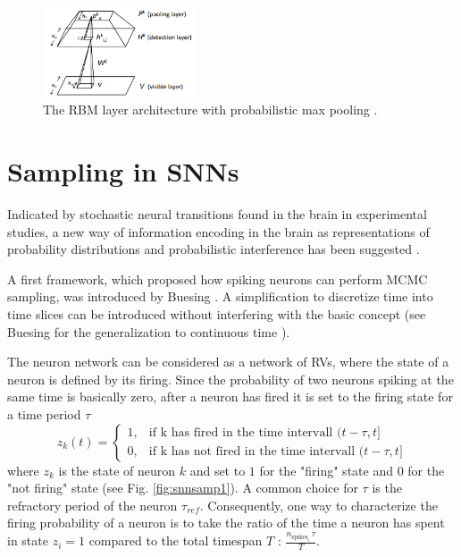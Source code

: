 \begin{figure}[h!]
	\centering
    	\includegraphics[width=0.4\textwidth]{imgs/prob_max_pool.png} 
    \caption{The RBM layer architecture with probabilistic max pooling \cite{lee2009convolutional}.}
	\label{fig:probmaxpool}
\end{figure}


\section{Sampling in SNNs} \label{c:snnsampling}

Indicated by stochastic neural transitions found in the brain in experimental studies, a new way of information encoding in the brain as representations of probability distributions and probabilistic interference has been suggested \cite{griffiths2008bayesian}\cite{lee2003hierarchical}\cite{yang2007probabilistic}.


A first framework, which proposed how spiking neurons can perform MCMC sampling, was introduced by Buesing \cite{Buesing2011}.
A simplification to discretize time into time slices can be introduced without interfering with the basic concept (see Buesing for the generalization to continuous time \cite{Buesing2011}).

The neuron network can be considered as a network of RVs, where the state of a neuron is defined by its firing. 
Since the probability of two neurons spiking at the same time is basically zero, after a neuron has fired it is set to the firing state for a time period $\tau$
\[
z_k(t) = 
\begin{cases}
1, &  \text{if k has fired in the time intervall } (t - \tau , t ] \\
0, &  \text{if k has not fired in the time intervall } (t - \tau , t ] 
\end{cases}
\] 
where $z_k$ is the state of neuron $k$ and set to $1$ for the "firing" state and $0$ for the "not firing" state (see Fig. \ref{fig:snnsamp1}). 
A common choice for $\tau$ is the refractory period of the neuron $\tau_{ref}$.
Consequently, one way to characterize the firing probability of a neuron is to take the ratio of the time a neuron has spent in state $z_i=1$ compared to the total timespan $T$ : $\frac{n_{\text{spikes}_i} \, \tau}{ T }$.

